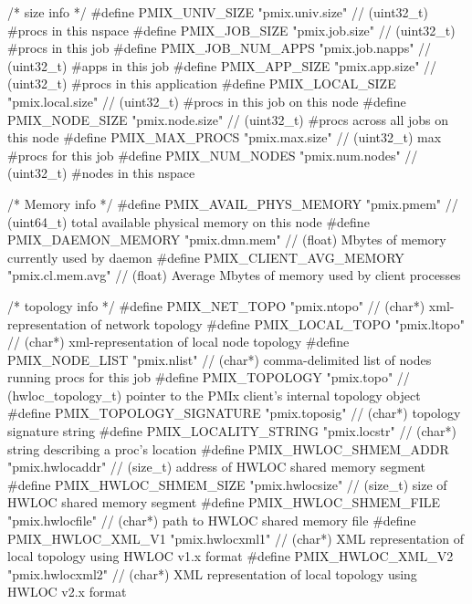 \begin{codepar}
/* size info */
#define PMIX_UNIV_SIZE                      "pmix.univ.size"        // (uint32_t) #procs in this nspace
#define PMIX_JOB_SIZE                       "pmix.job.size"         // (uint32_t) #procs in this job
#define PMIX_JOB_NUM_APPS                   "pmix.job.napps"        // (uint32_t) #apps in this job
#define PMIX_APP_SIZE                       "pmix.app.size"         // (uint32_t) #procs in this application
#define PMIX_LOCAL_SIZE                     "pmix.local.size"       // (uint32_t) #procs in this job on this node
#define PMIX_NODE_SIZE                      "pmix.node.size"        // (uint32_t) #procs across all jobs on this node
#define PMIX_MAX_PROCS                      "pmix.max.size"         // (uint32_t) max #procs for this job
#define PMIX_NUM_NODES                      "pmix.num.nodes"        // (uint32_t) #nodes in this nspace

/* Memory info */
#define PMIX_AVAIL_PHYS_MEMORY              "pmix.pmem"             // (uint64_t) total available physical memory on this node
#define PMIX_DAEMON_MEMORY                  "pmix.dmn.mem"          // (float) Mbytes of memory currently used by daemon
#define PMIX_CLIENT_AVG_MEMORY              "pmix.cl.mem.avg"       // (float) Average Mbytes of memory used by client processes

/* topology info */
#define PMIX_NET_TOPO                       "pmix.ntopo"            // (char*) xml-representation of network topology
#define PMIX_LOCAL_TOPO                     "pmix.ltopo"            // (char*) xml-representation of local node topology
#define PMIX_NODE_LIST                      "pmix.nlist"            // (char*) comma-delimited list of nodes running procs for this job
#define PMIX_TOPOLOGY                       "pmix.topo"             // (hwloc_topology_t) pointer to the PMIx client's internal topology object
#define PMIX_TOPOLOGY_SIGNATURE             "pmix.toposig"          // (char*) topology signature string
#define PMIX_LOCALITY_STRING                "pmix.locstr"           // (char*) string describing a proc's location
#define PMIX_HWLOC_SHMEM_ADDR               "pmix.hwlocaddr"        // (size_t) address of HWLOC shared memory segment
#define PMIX_HWLOC_SHMEM_SIZE               "pmix.hwlocsize"        // (size_t) size of HWLOC shared memory segment
#define PMIX_HWLOC_SHMEM_FILE               "pmix.hwlocfile"        // (char*) path to HWLOC shared memory file
#define PMIX_HWLOC_XML_V1                   "pmix.hwlocxml1"        // (char*) XML representation of local topology using HWLOC v1.x format
#define PMIX_HWLOC_XML_V2                   "pmix.hwlocxml2"        // (char*) XML representation of local topology using HWLOC v2.x format



\end{codepar}
